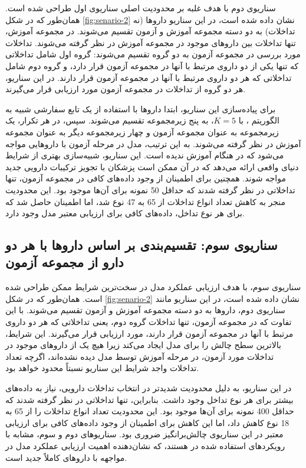 سناریوی دوم با هدف غلبه بر محدودیت اصلی سناریوی اول طراحی شده است. همان‌طور که در شکل \ref{fig:senario-2} نشان داده شده است، در این سناریو داروها (نه تداخلات) به دو دسته مجموعه آموزش و آزمون تقسیم می‌شوند. در مجموعه آموزش، تنها تداخلات بین داروهای موجود در مجموعه آموزش در نظر گرفته می‌شوند. تداخلات مورد بررسی در مجموعه آزمون به دو گروه تقسیم می‌شوند: گروه اول شامل تداخلاتی که تنها یکی از دو داروی مرتبط با آنها در مجموعه آزمون قرار دارد، و گروه دوم شامل تداخلاتی که هر دو داروی مرتبط با آنها در مجموعه آزمون قرار دارند. در این سناریو، هر دو گروه از تداخلات در مجموعه آزمون مورد ارزیابی قرار می‌گیرند.

برای پیاده‌سازی این سناریو، ابتدا داروها با استفاده از یک تابع سفارشی شبیه به الگوریتم ، با $K=5$، به پنج زیرمجموعه تقسیم می‌شوند. سپس، در هر تکرار، یک زیرمجموعه به عنوان مجموعه آزمون و چهار زیرمجموعه دیگر به عنوان مجموعه آموزش در نظر گرفته می‌شوند. به این ترتیب، مدل در مرحله آزمون با داروهایی مواجه می‌شود که در هنگام آموزش ندیده است. این سناریو، شبیه‌سازی بهتری از شرایط دنیای واقعی ارائه می‌دهد که در آن ممکن است پزشکان با تجویز ترکیبات دارویی جدید مواجه شوند. همچنین برای اطمینان از وجود داده‌های کافی در مجموعه آزمون، تنها تداخلاتی در نظر گرفته شدند که حداقل 50 نمونه برای آن‌ها موجود بود. این محدودیت منجر به کاهش تعداد انواع تداخلات از 65 به 47 نوع شد، اما اطمینان حاصل شد که برای هر نوع تداخل، داده‌های کافی برای ارزیابی معتبر مدل وجود دارد.

\subsection{سناریوی سوم: تقسیم‌بندی بر اساس داروها با هر دو دارو از مجموعه آزمون}


سناریوی سوم، با هدف ارزیابی عملکرد مدل در سخت‌ترین شرایط ممکن طراحی شده است. همان‌طور که در شکل \ref{fig:senario-2} نشان داده شده است، در این سناریو مانند سناریوی دوم، داروها به دو دسته مجموعه آموزش و آزمون تقسیم می‌شوند. با این تفاوت که در مجموعه آزمون، تنها تداخلات گروه دوم، یعنی تداخلاتی که هر دو داروی مرتبط با آنها در مجموعه آزمون قرار دارند، مورد ارزیابی قرار می‌گیرند. این شرایط، بالاترین سطح چالش را برای مدل ایجاد می‌کند زیرا هیچ یک از داروهای موجود در تداخلات مورد آزمون، در مرحله آموزش توسط مدل دیده نشده‌اند، اگرچه تعداد تداخلات واجد شرایط این سناریو نسبتاً محدود خواهد بود.

در این سناریو، به دلیل محدودیت شدیدتر در انتخاب تداخلات دارویی، نیاز به داده‌های بیشتر برای هر نوع تداخل وجود داشت. بنابراین، تنها تداخلاتی در نظر گرفته شدند که حداقل 400 نمونه برای آن‌ها موجود بود. این محدودیت تعداد انواع تداخلات را از 65 به 18 نوع کاهش داد، اما این کاهش برای اطمینان از وجود داده‌های کافی برای ارزیابی معتبر در این سناریوی چالش‌برانگیز ضروری بود. سناریوهای دوم و سوم، مشابه با رویکردهای استفاده شده در \cite{ref_deng2020} هستند، که نشان‌دهنده اهمیت ارزیابی عملکرد مدل در مواجهه با داروهای کاملاً جدید است.

